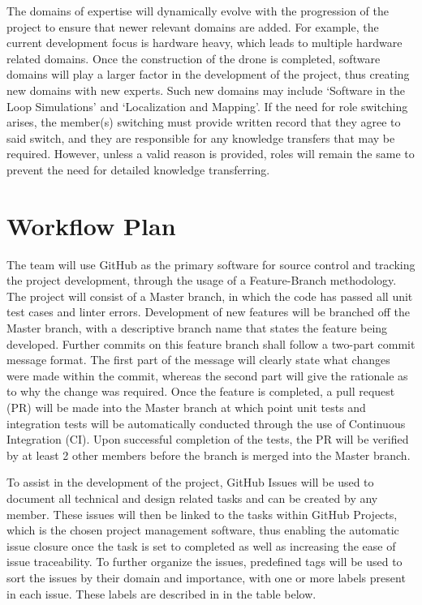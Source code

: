 \documentclass{article}
\begin{document}
\clearpage

The domains of expertise will dynamically evolve with the progression of the project to ensure that newer relevant domains are added. For example, the current development focus is hardware heavy, which leads to multiple hardware related domains. Once the construction of the drone is completed, software domains will play a larger factor in the development of the project, thus creating new domains with new experts. Such new domains may include ‘Software in the Loop Simulations’ and ‘Localization and Mapping’. If the need for role switching arises, the member(s) switching must provide written record that they agree to said switch, and they are responsible for any knowledge transfers that may be required. However, unless a valid reason is provided, roles will remain the same to prevent the need for detailed knowledge transferring. 

\section{Workflow Plan}

The team will use GitHub as the primary software for source control and tracking the project development, through the usage of a Feature-Branch methodology. The project will consist of a Master branch, in which the code has passed all unit test cases and linter errors. Development of new features will be branched off the Master branch, with a descriptive branch name that states the feature being developed. Further commits on this feature branch shall follow a two-part commit message format. The first part of the message will clearly state what changes were made within the commit, whereas the second part will give the rationale as to why the change was required. Once the feature is completed, a pull request (PR) will be made into the Master branch at which point unit tests and integration tests will be automatically conducted through the use of Continuous Integration (CI). Upon successful completion of the tests, the PR will be verified by at least 2 other members before the branch is merged into the Master branch.  

To assist in the development of the project, GitHub Issues will be used to document all technical and design related tasks and can be created by any member. These issues will then be linked to the tasks within GitHub Projects, which is the chosen project management software, thus enabling the automatic issue closure once the task is set to completed as well as increasing the ease of issue traceability. To further organize the issues, predefined tags will be used to sort the issues by their domain and importance, with one or more labels present in each issue. These labels are described in in the table below. 
\end{document}
